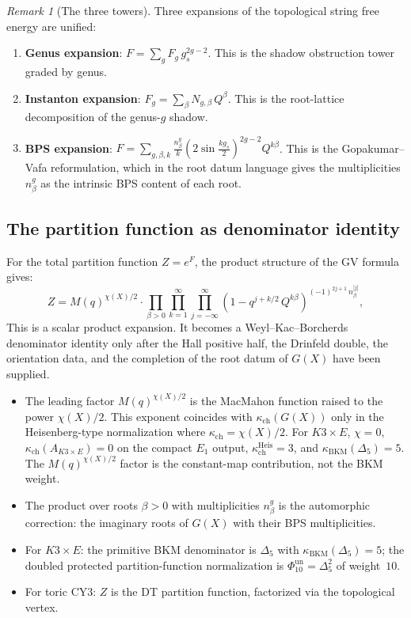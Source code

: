 \documentclass[11pt]{amsart}
\theoremstyle{plain}
\theoremstyle{definition}
\theoremstyle{remark}
\newtheorem{remark}[theorem]{Remark}
\begin{document}
\begin{remark}[The three towers]
Three expansions of the topological string free energy are unified:
\begin{enumerate}
 \item \textbf{Genus expansion}: $F = \sum_g F_g\, g_s^{2g-2}$. This is
 the shadow obstruction tower graded by genus.
 \item \textbf{Instanton expansion}: $F_g = \sum_\beta N_{g,\beta}\, Q^\beta$.
 This is the root-lattice decomposition of the genus-$g$ shadow.
 \item \textbf{BPS expansion}: $F = \sum_{g,\beta,k} \frac{n^g_\beta}{k}
 (2\sin \frac{kg_s}{2})^{2g-2} Q^{k\beta}$. This is the
 Gopakumar--Vafa reformulation, which in the root datum language gives the
 multiplicities $n^g_\beta$ as the intrinsic BPS content of each root.
\end{enumerate}
\end{remark}

\subsection{The partition function as denominator identity}
\label{sub:denominator}

For the total partition function $Z = e^F$, the product structure of the GV
formula gives:
\begin{equation}\label{eq:z-product}
 Z = M(q)^{\chi(X)/2} \cdot \prod_{\beta > 0}
 \prod_{k=1}^{\infty} \prod_{j=-\infty}^{\infty}
 \left(1 - q^{j+k/2}\, Q^{k\beta}\right)^{(-1)^{2j+1}\, n^{|j|}_\beta},
\end{equation}
This is a scalar product expansion. It becomes a Weyl--Kac--Borcherds
denominator identity only after the Hall positive half, the Drinfeld
double, the orientation data, and the completion of the root datum of
$G(X)$ have been supplied.

\begin{itemize}
 \item The leading factor $M(q)^{\chi(X)/2}$ is the MacMahon function
 raised to the power $\chi(X)/2$. This exponent coincides with
 $\kappa_{\mathrm{ch}}(G(X))$ only in the Heisenberg-type normalization
 where $\kappa_{\mathrm{ch}} = \chi(X)/2$. For $K3 \times E$,
 $\chi = 0$, $\kappa_{\mathrm{ch}}(A_{K3\times E})=0$ on the compact
 $E_1$ output, $\kappa_{\mathrm{ch}}^{\mathrm{Heis}}=3$, and
 $\kappa_{\mathrm{BKM}}(\Delta_5)=5$. The $M(q)^{\chi(X)/2}$ factor is
 the constant-map contribution, not the BKM weight.
 \item The product over roots $\beta > 0$ with multiplicities $n^g_\beta$
 is the automorphic correction: the imaginary roots of $G(X)$ with
 their BPS multiplicities.
 \item For $K3 \times E$: the primitive BKM denominator is
 $\Delta_5$ with $\kappa_{\mathrm{BKM}}(\Delta_5)=5$; the doubled
 protected partition-function normalization is
 $\Phi_{10}^{\mathrm{un}}=\Delta_5^2$ of weight~$10$.
 \item For toric CY3: $Z$ is the DT partition function, factorized via the
 topological vertex.
\end{itemize}
\end{document}
